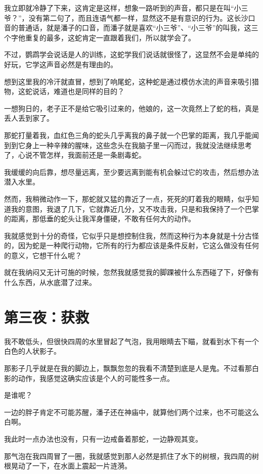 我立即就冷静了下来，这肯定是这样，想象一路听到的声音，都只是在叫“小三爷？”，没有第二句了，而且连语气都一样，显然这不是有意识的行为。这长沙口音的普通话，就是潘子的口音，而潘子就是喜欢“小三爷”、“小三爷”的叫我，这三个字他重复的最多，这蛇肯定一直跟着我们，所以就学会了。

不过，鹦鹉学会说话是人的训练，这蛇学我们说话就很怪了，这显然不会是单纯的好玩，它学这声音必然是有理由的。

想到这里我的冷汗就直冒，想到了响尾蛇，这种蛇是通过模仿水流的声音来吸引猎物，这蛇说话，难道也是同样的目的？

一想狗日的，老子正不是给它吸引过来的，他娘的，这一次竟然上了蛇的档，真是丢人丢到家了。

那蛇打量着我，血红色三角的蛇头几乎离我的鼻子就一个巴掌的距离，我几乎能闻到到它身上一种辛辣的腥味，这些念头在我脑子里一闪而过，我就没法继续思考了，心说不管怎样，我面前还是一条剧毒蛇。

我缓缓的向后靠，想尽量远离，至少要远离到能有机会躲过它的攻击，然后想办法潜入水里。

然而，我稍微动作一下，那蛇就又猛的靠近了一点，死死的盯着我的眼睛，似乎知道我的意图，我退了几下，它就靠近几分，又不攻击我，只是和我保持了一个巴掌的距离，那低垂的蛇头让我浑身僵硬，不敢有任何大的动作。

我就感觉到十分的奇怪，它似乎只是想控制住我，然而这种行为本身就是十分古怪的，因为蛇是一种爬行动物，它所有的行为都应该是条件反射，它这么做没有任何的意义，它想干什么呢？

就在我纳闷又无计可施的时候，忽然我就感觉我的脚踝被什么东西碰了下，好像有什么东西，从水底潜了过来。

\chapter{第三夜：获救}

我不敢低头，但很快四周的水里冒起了气泡，我用眼睛去下瞄，就看到水下有一个白色的人状影子。

那影子几乎就是在我的脚边上，飘飘忽忽的我看不清楚到底是人是鬼。不过看那白影的动作，我感觉这确实应该是个人的可能性多一点。

是谁呢？

一边的胖子肯定不可能苏醒，潘子还在神庙中，就算他们两个过来，也不可能这么白啊。

我此时一点办法也没有，只有一边戒备着那蛇，一边静观其变。

那气泡在我四周冒了一圈，我就感觉到那人必然是抓住了水下的树根，我四周的树根晃动了一下，在水面上震起一片涟漪。

